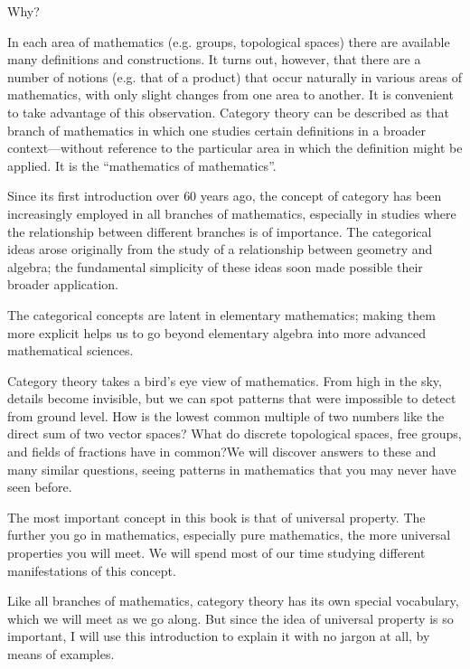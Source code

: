 \begin{plSection}{Why?}
\begin{plQuote}
\end{plQuote}

\begin{plQuote}
{}
{}
In each area of mathematics 
(e.g. groups, topological spaces) 
there are available many definitions and constructions.
It turns out, however, that there are a number of notions
(e.g. that of a product) that occur naturally 
in various areas of mathematics, with only slight changes from
one area to another.
It is convenient to take advantage of this observation.
Category theory can be described as that branch of mathematics
in which one studies certain definitions in a broader context---without
reference to the particular area 
in which the definition might be applied.
It is the ``mathematics of mathematics''.
\end{plQuote}

\begin{plQuote}
{}
{}
Since its first introduction over $60$ years ago, the concept of category has been
increasingly employed in all branches of mathematics, especially in studies where the
relationship between different branches is of importance. The categorical ideas arose
originally from the study of a relationship between geometry and algebra; the
fundamental simplicity of these ideas soon made possible their broader application.
\par
The categorical concepts are latent in elementary mathematics; making them more
explicit helps us to go beyond elementary algebra into more advanced mathematical
sciences.
\end{plQuote}

\begin{plQuote}
{}
{}
Category theory takes a bird’s eye view of mathematics. From high in the sky,
details become invisible, but we can spot patterns that were impossible to detect
from ground level. How is the lowest common multiple of two numbers
like the direct sum of two vector spaces? What do discrete topological spaces,
free groups, and fields of fractions have in common?We will discover answers
to these and many similar questions, seeing patterns in mathematics that you
may never have seen before.
\par
The most important concept in this book is that of universal property. The
further you go in mathematics, especially pure mathematics, the more universal
properties you will meet. We will spend most of our time studying different
manifestations of this concept.
\par
Like all branches of mathematics, category theory has its own special vocabulary,
which we will meet as we go along. But since the idea of universal
property is so important, I will use this introduction to explain it with no jargon
at all, by means of examples.
\end{plQuote}


\end{plSection}

